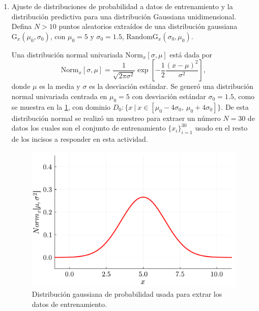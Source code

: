 \begin{enumerate}
    \item Ajuste de distribuciones de probabilidad a datos de entrenamiento y la distribución predictiva para una distribución Gaussiana unidimensional. Defina $N > 10$ puntos aleatorios extraídos de una distribución gaussiana $\text{G}_{x}(\mu_0, \sigma_0)$, con $\mu_0 = 5$ y $\sigma_0 = 1.5$, $\text{RandomG}_{x}(\sigma_0, \mu_0)$.
    \begin{solution}
        Una distribución normal univariada $\text{Norm}_{x}[\sigma, \mu]$ está dada por
        \begin{equation}
            \text{Norm}_{x}[\sigma, \mu] = \frac{1}{\sqrt{2 \pi \sigma^2}} \exp\left[- \frac{1}{2} \frac{(x - \mu)^2}{\sigma^2}\right],
        \end{equation}
        donde $\mu$ es la media y $\sigma$ es la desviación estándar. Se generó una distribución normal univariada centrada en $\mu_0  = 5$ con desviación estándar $\sigma_0 = 1.5$, como se muestra en la \cref{fig:original}, con dominio $D_0 : \{x\ |\ x \in \left[\mu_0 - 4 \sigma_0,\ \mu_0 + 4 \sigma_0\right]\}$. De esta distribución normal se realizó un muestreo para extraer un número $N = 30$ de datos los cuales son el conjunto de entrenamiento $\{x_i\}_{i=1}^{30}$ usado en el resto de los incisos a responder en esta actividad.
        \begin{figure}[ht!]
            \centering
            \includegraphics[scale=0.4]{../figures/original.pdf}
            \caption{Distribución gaussiana de probabilidad usada para extrar los datos de entrenamiento.}
            \label{fig:original}
        \end{figure}
        

\end{solution}
\end{enumerate}
